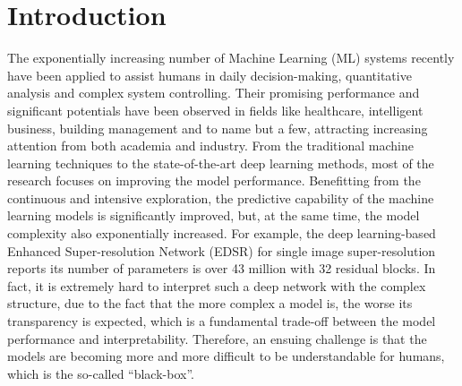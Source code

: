 \documentclass[11pt]{article}
\begin{document}
\section{Introduction}

The exponentially increasing number of Machine Learning (ML) systems recently have been applied to assist humans in daily decision-making, quantitative analysis and complex system controlling. Their promising performance and significant potentials have been observed in fields like healthcare\citep{meira2020contextualized}\citep{char2018implementing}, intelligent business\citep{kraus2020deep}\citep{ebadi2019can}, building management\citep{grammenos2021analysis}\citep{fan2019novel} and to name but a few, attracting increasing attention from both academia and industry. From the traditional machine learning techniques to the state-of-the-art deep learning methods, most of the research focuses on improving the model performance. Benefitting from the continuous and intensive exploration, the predictive capability of the machine learning models is significantly improved, but, at the same time, the model complexity also exponentially increased. For example, the deep learning-based Enhanced Super-resolution Network (EDSR) for single image super-resolution reports its number of parameters is over 43 million with 32 residual blocks\citep{lim2017enhanced}. In fact, it is extremely hard to interpret such a deep network with the complex structure, due to the fact that the more complex a model is, the worse its transparency is expected, which is a fundamental trade-off between the model performance and interpretability\citep{hall2019introduction}. Therefore, an ensuing challenge is that the models are becoming more and more difficult to be understandable for humans, which is the so-called “black-box”.
\end{document}

